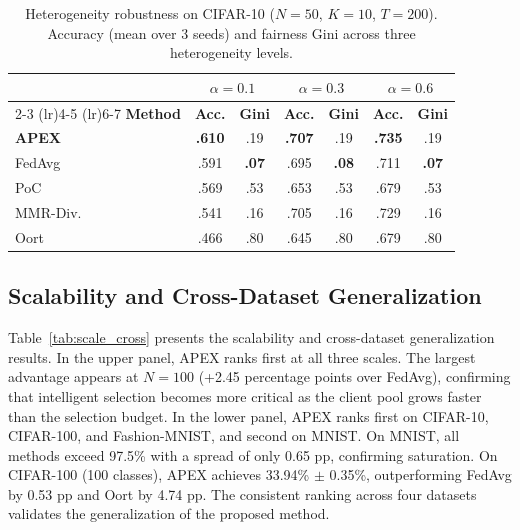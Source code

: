 \documentclass[journal]{IEEEtran}
\begin{document}
\begin{table}[t]
\centering
\caption{Heterogeneity robustness on CIFAR-10 ($N = 50$, $K = 10$, $T = 200$). Accuracy (mean over 3 seeds) and fairness Gini across three heterogeneity levels.}
\label{tab:heterogeneity}
\footnotesize
\renewcommand{\arraystretch}{1.0}
\setlength{\tabcolsep}{2.5pt}
\begin{tabular}{lcccccc}
\toprule
& \multicolumn{2}{c}{$\alpha = 0.1$} & \multicolumn{2}{c}{$\alpha = 0.3$} & \multicolumn{2}{c}{$\alpha = 0.6$} \\
\cmidrule(lr){2-3} \cmidrule(lr){4-5} \cmidrule(lr){6-7}
\textbf{Method} & \textbf{Acc.} & \textbf{Gini} & \textbf{Acc.} & \textbf{Gini} & \textbf{Acc.} & \textbf{Gini} \\
\midrule
\textbf{APEX} & \textbf{.610} & .19 & \textbf{.707} & .19 & \textbf{.735} & .19 \\
FedAvg & .591 & \textbf{.07} & .695 & \textbf{.08} & .711 & \textbf{.07} \\
PoC & .569 & .53 & .653 & .53 & .679 & .53 \\
MMR-Div. & .541 & .16 & .705 & .16 & .729 & .16 \\
Oort & .466 & .80 & .645 & .80 & .679 & .80 \\
\bottomrule
\end{tabular}
\end{table}

\subsection{Scalability and Cross-Dataset Generalization}

Table~\ref{tab:scale_cross} presents the scalability and cross-dataset generalization results. In the upper panel, APEX ranks first at all three scales. The largest advantage appears at $N = 100$ (+2.45 percentage points over FedAvg), confirming that intelligent selection becomes more critical as the client pool grows faster than the selection budget. In the lower panel, APEX ranks first on CIFAR-10, CIFAR-100, and Fashion-MNIST, and second on MNIST. On MNIST, all methods exceed 97.5\% with a spread of only 0.65 pp, confirming saturation. On CIFAR-100 (100 classes), APEX achieves 33.94\% $\pm$ 0.35\%, outperforming FedAvg by 0.53 pp and Oort by 4.74 pp. The consistent ranking across four datasets validates the generalization of the proposed method.
\end{document}
